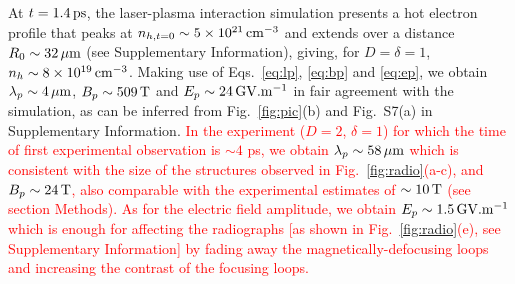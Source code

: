 \documentclass[aps,twocolumn,showpacs,superscriptaddress]{revtex4}
\begin{document}
At  $t = 1.4\,\rm ps$, the laser-plasma interaction simulation presents a hot electron profile that peaks at $n_{h, t=0} \sim 5\times 10^{21}\,\rm cm^{-3}$ and extends over a distance $R_0\sim 32\,\rm \mu m$ (see Supplementary Information), giving, for $D=\delta=1$, $n_h \sim 8 \times 10^{19}\,\rm cm^{-3}$.
Making use of Eqs.~\eqref{eq:lp}, \eqref{eq:bp} and \eqref{eq:ep}, we obtain $\lambda_p \sim 4 \,\rm \mu m$, $B_p \sim 509\,\rm T$ and $E_p\sim 24\,\rm GV.m^{-1}$ in fair agreement with the simulation, as can be inferred from Fig.~\ref{fig:pic}(b) and Fig.~S7(a) in Supplementary Information. 
\textcolor{red}{
In the experiment ($D=2$, $\delta=1$) for which the time of first experimental observation is $\sim 4$ ps, we obtain
$\lambda_p \sim 58 \,\rm \mu m$ which is consistent with the size of the structures observed in Fig.~\ref{fig:radio}(a-c), and   $B_p\sim 24\,\rm T$, also comparable with the experimental estimates of $\sim 10\,\rm T$ (see section Methods). As for the electric field amplitude, we obtain $E_p \sim 1.5\,\rm GV.m^{-1}$ which is enough for affecting  the radiographs [as shown in Fig.~\ref{fig:radio}(e), see Supplementary Information] by fading away the magnetically-defocusing loops and increasing the contrast of the focusing loops.
}
\end{document}
